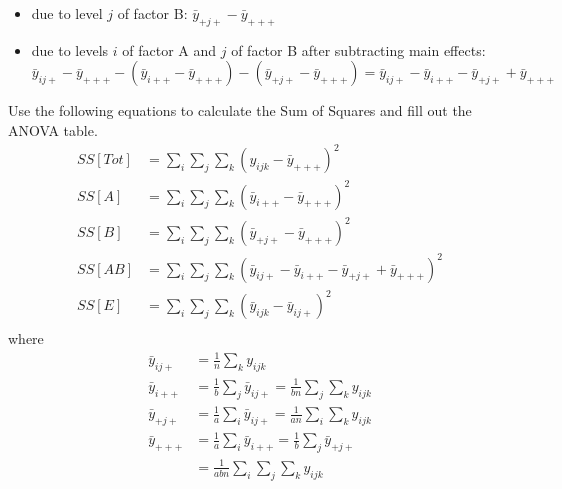 \begin{enumerate}
\begin{itemize}
	\item due to level $j$ of factor B: $\bar{y}_{+j+} - \bar{y}_{+++}$	
	\item due to levels $i$ of factor A and $j$ of factor B after subtracting main effects:
	$$
	\bar{y}_{ij+} - \bar{y}_{+++} - (\bar{y}_{i++} - \bar{y}_{+++}) - (\bar{y}_{+j+} - \bar{y}_{+++}) = \bar{y}_{ij+} - \bar{y}_{i++} - \bar{y}_{+j+} + \bar{y}_{+++}
	$$
\end{itemize}
Use the following equations to calculate the Sum of Squares and fill out the ANOVA table.
$$
\begin{aligned}
SS[Tot] &= \sum\limits_i \sum\limits_j \sum\limits_k (y_{ijk} - \bar{y}_{+++})^2\\
SS[A] &= \sum\limits_i \sum\limits_j \sum\limits_k (\bar{y}_{i++}- \bar{y}_{+++})^2\\
SS[B] &= \sum\limits_i \sum\limits_j \sum\limits_k (\bar{y}_{+j+}- \bar{y}_{+++})^2\\
SS[AB] &= \sum\limits_i \sum\limits_j \sum\limits_k (\bar{y}_{ij+} - \bar{y}_{i++} - \bar{y}_{+j+} + \bar{y}_{+++})^2\\
SS[E] &= \sum\limits_i \sum\limits_j \sum\limits_k (\bar{y}_{ijk}- \bar{y}_{ij+})^2\\
\end{aligned}
$$
where
$$
\begin{aligned}
	\bar{y}_{ij+} &= \frac{1}{n} \sum\limits_k y_{ijk}\\ 
	\bar{y}_{i++} &= \frac{1}{b} \sum\limits_j \bar{y}_{ij+} = \frac{1}{bn} \sum\limits_j \sum\limits_k y_{ijk}\\ 
	\bar{y}_{+j+} &= \frac{1}{a} \sum\limits_i \bar{y}_{ij+}= \frac{1}{an} \sum\limits_i \sum\limits_k y_{ijk}\\ 
	\bar{y}_{+++} &= \frac{1}{a} \sum\limits_i \bar{y}_{i++}= \frac{1}{b} \sum\limits_j \bar{y}_{+j+}\\
	&= \frac{1}{abn} \sum\limits_i \sum\limits_j \sum\limits_k y_{ijk}
\end{aligned}
$$


\end{enumerate}
